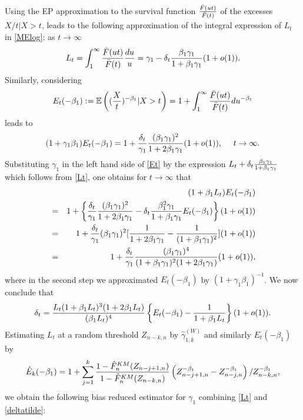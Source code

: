 Using the EP approximation to the survival function ${\bar{F}(ut) \over \bar{F}(t)} $ of the excesses $X/t|X>t$, leads to the following approximation of the integral expression of $L_t$ in \eqref{MElog}: as $t\to \infty$
\begin{equation}
L_t = \int_1^{\infty} {\bar{F}(ut) \over \bar{F}(t)} {du \over u} = \gamma_1 - \delta_t {\beta_1 \gamma_1 \over 1+\beta_1 \gamma_1}(1+o(1)).
\label{Lt}
\end{equation}
Similarly, considering 
$$E_t (-\beta_1):= \mathbb{E} \left( ({X \over t})^{-\beta_1}|X>t \right) = 1+ \int_1^{\infty}{\bar{F}(ut) \over \bar{F}(t)}
du^{-\beta_1}$$ leads to 
\begin{equation}
(1+\gamma_1\beta_1) E_t (-\beta_1) = 1 + {\delta_t \over \gamma_1} {(\beta_1 \gamma_1)^2 \over 1+2\beta_1 \gamma_1}(1+o(1)),\ \ \ \ t \rightarrow \infty.
\label{Et}
\end{equation}
Substituting $\gamma_1$ in the left hand side of \eqref{Et} by
the expression $L_t + \delta_t {\beta_1 \gamma_1 \over 1+\beta_1 \gamma_1}$ which follows from \eqref{Lt}, one obtains for $t \to \infty$ that
\begin{eqnarray*}
&& \hspace{-1cm}(1+\beta_1 L_t) E_t(-\beta_1) \\&=& 1+ \left\{ {\delta_t \over \gamma_1}
{(\beta_1 \gamma_1)^2 \over 1+2\beta_1 \gamma_1}- \delta_t {\beta_1^2 \gamma_1 \over 1+\beta_1 \gamma_1}E_t(-\beta_1)\right\} (1+o(1))\\
&=& 1+ {\delta_t \over \gamma_1}(\beta_1 \gamma_1)^2 [{1 \over 1+2\beta_1\gamma_1}-{1 \over (1+\beta_1\gamma_1)^2}](1+o(1))\\
&=& 1+ {\delta_t \over \gamma_1}{ (\beta_1 \gamma_1)^4 \over (1+\beta_1\gamma_1)^2(1+2\beta_1\gamma_1)}(1+o(1)),
\end{eqnarray*} 
where in the second step we approximated $E_t(-\beta_1)$ by $(1+\gamma_1\beta_1)^{-1}$. We now conclude that 
\begin{equation}
\delta_t = {L_t (1+\beta_1 L_t)^3(1+2\beta_1 L_t) \over (\beta_1 L_t)^4}\left\{E_t(-\beta_1)-{1 \over 1+\beta_1 L_t} \right\}(1+o(1)).
\label{deltatilde}
\end{equation}
Estimating $L_t$ at a random threshold $Z_{n-k,n}$ by $\hat{\gamma}_{1,k}^{(W)}$ and similarly $E_t(-\beta_1)$ by
\[
\hat{E}_k (-\beta_1)= 1+ \sum_{j=1}^k {1-\hat{F}^{KM}_n (Z_{n-j+1,n}) \over 1-\hat{F}^{KM}_n (Z_{n-k,n})} 
\left( Z^{-\beta_1}_{n-j+1,n}- Z_{n-j,n}^{-\beta_1} \right)/Z^{-\beta_1}_{n-k,n},
\]
we obtain the following bias reduced estimator for $\gamma_1$ combining \eqref{Lt} and \eqref{deltatilde}:
